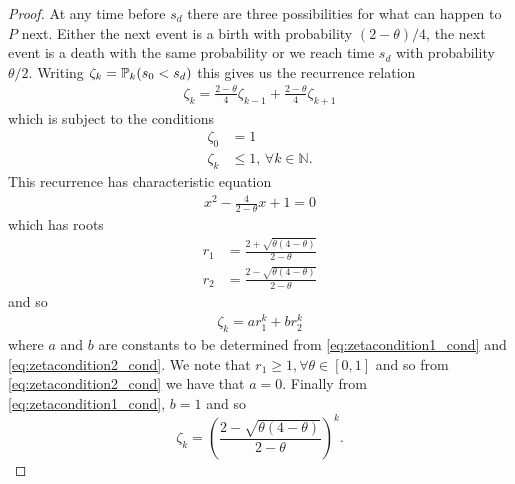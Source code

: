 \begin{proof}

		 At any time before $s_d$ there are three possibilities for what can happen to $P$ next. Either the next event is a birth with probability $(2 - \theta)/4$, the next event is a death with the same probability or we reach time $s_d$ with probability $\theta/2$. Writing $\zeta_k = \mathbb{P}_k(s_0 < s_d)$ this gives us the recurrence relation
		 \begin{align}
		 	\zeta_k = \frac{2 - \theta}{4} \zeta_{k-1} + \frac{2 - \theta}{4} \zeta_{k+1}
		 \end{align}
		 which is subject to the conditions 
		 \begin{align}
		 	\label{eq:zetacondition1_cond}
		 	\zeta_0 &= 1\\
		 	\zeta_k &\leq 1, \, \forall k \in \mathbb{N}.
		 	\label{eq:zetacondition2_cond}
		 \end{align} 
		 This recurrence has characteristic equation
		 \begin{align}
		 	x^2 - \frac{4}{2 - \theta} x + 1 = 0
		 \end{align}
		 which has roots
		 \begin{align}
		 	r_1 &= \frac{2 + \sqrt{\theta(4 - \theta)}}{2 - \theta}\\
		 	r_2 &= \frac{2 - \sqrt{\theta(4 - \theta)}}{2 - \theta}
		 \end{align}
		 and so
		 \begin{align}
		 	\zeta_k = a r_1^k + b r_2^k
		 \end{align}
		 where $a$ and $b$ are constants to be determined from \eqref{eq:zetacondition1_cond} and \eqref{eq:zetacondition2_cond}. We note that $r_1 \geq 1, \forall \theta \in [0,1]$ and so from \eqref{eq:zetacondition2_cond} we have that $a = 0$. Finally from \eqref{eq:zetacondition1_cond}, $b = 1$ and so
		 \begin{equation}
		 	\zeta_k = \left(\frac{2 - \sqrt{\theta(4 - \theta)}}{2 - \theta}\right)^k.
		 \end{equation}
	\end{proof}